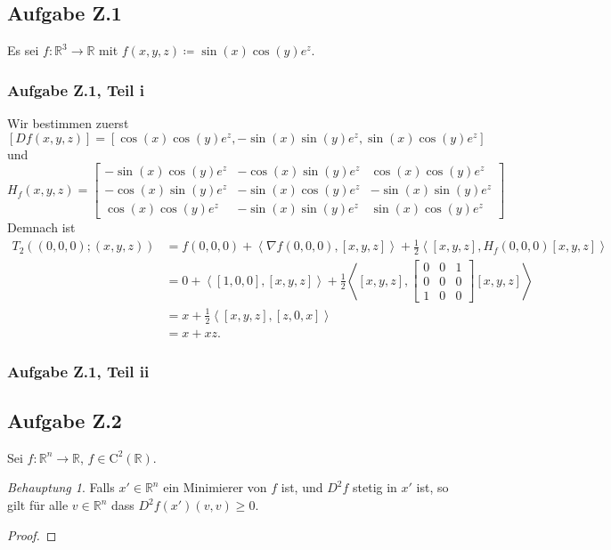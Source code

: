 \documentclass[draft,a5paper]{article}
\theoremstyle{remark}
\newtheorem*{beh}{Behauptung}
\newcommand{\enAngle}[1]{\left\langle#1\right\rangle}
\let\scp=\enAngle
\begin{document}
\subsection*{Aufgabe Z.1}
Es sei \(f\colon \mathbb{R}^{3} \to \mathbb{R}\) mit \(f(x, y, z) \coloneq \sin (x) \cos(y) e^{z}\).
\subsubsection*{Aufgabe Z.1, Teil i}
Wir bestimmen zuerst
\[[Df(x, y, z)] = [\cos(x) \cos(y) e^{z}, - \sin(x) \sin(y) e^{z},
  \sin(x) \cos(y) e^{z}]\]
und
\[H_{f}(x, y, z) =
  \begin{bmatrix}
    - \sin(x) \cos(y) e^{z}
    & - \cos(x) \sin(y) e^{z}
    & \cos(x) \cos(y) e^{z} \\
    - \cos(x) \sin(y) e^{z}
    & - \sin(x) \cos(y) e^{z}
    & - \sin(x) \sin(y) e^{z} \\
    \cos(x) \cos(y) e^{z}
    & - \sin(x) \sin(y) e^{z}
    & \sin(x) \cos(y) e^{z}
  \end{bmatrix}
\]
Demnach ist
\begin{align*}
  T_{2}((0,0,0);(x,y,z))
  &= f(0,0,0) + \scp{\nabla f(0,0,0),
  [x, y, z]
  } + \frac{1}{2} \scp{
  [x, y, z],
  H_{f}(0,0,0)
    [x, y, z]} \\
  &= 0 + \scp{[1,0,0], [x, y, z]} + \frac{1}{2}
    \scp{[x, y, z],
    \begin{bmatrix}
      0 & 0 & 1 \\
      0 & 0 & 0 \\
      1 & 0 & 0
    \end{bmatrix}
    [x, y, z]
    } \\
  &= x + \frac{1}{2} \scp{[x, y, z], [z, 0, x]} \\
  &= x + xz.
\end{align*}
\subsubsection*{Aufgabe Z.1, Teil ii}

\newpage

\subsection*{Aufgabe Z.2}
Sei \(f\colon \mathbb{R}^{n} \to \mathbb{R}\), \(f \in \mathrm{C}^{2}(\mathbb{R})\).
\begin{beh}
  Falls \(x' \in \mathbb{R}^{n}\) ein Minimierer von \(f\) ist, und \(D^{2}f\)
  stetig in \(x'\) ist, so gilt für alle \(v \in \mathbb{R}^{n}\) dass
  \(D^{2}f(x')(v, v) \ge 0\).
\end{beh}
\begin{proof}

\end{proof}
\end{document}
